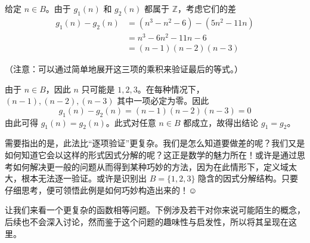 给定 $n \in B$。由于 $g_1(n)$ 和 $g_2(n)$ 都属于 $\mathbb{Z}$，考虑它们的差
\begin{align*}
    g_1(n) - g_2(n) &= (n^3 - n^2 - 6) - (5n^2 - 11n) \\
    &= n^3 - 6n^2 - 11n - 6 \\
    &= (n - 1)(n - 2)(n - 3)
\end{align*}

（注意：可以通过简单地展开这三项的乘积来验证最后的等式。）

由于 $n \in B$，因此 $n$ 只可能是 $1,2,3$。在每种情况下，$(n - 1), (n - 2), (n - 3)$ 其中一项必定为零。因此
\[g_1(n) - g_2(n) = (n - 1)(n - 2)(n - 3) = 0\]
由此可得 $g_1(n) = g_2(n)$。此式对任意 $n \in B$ 都成立，故得出结论 $g_1 = g_2$。

需要指出的是，此法比``逐项验证''更复杂。我们是怎么知道要做差的呢？我们又是如何知道它会以这样的形式因式分解的呢？这正是数学的魅力所在！或许是通过思考如何解决更一般的问题从而得到某种巧妙的方法，因为在此情形下，定义域太大，根本无法逐一验证。或许是识别出 $B = \{1, 2, 3\}$ 隐含的因式分解结构。只要仔细思考，便可领悟此例是如何巧妙构造出来的！$\smiley{}$

让我们来看一个更复杂的函数相等问题。下例涉及若干对你来说可能陌生的概念，后续也不会深入讨论，然而鉴于这个问题的趣味性与启发性，所以将其呈现在这里。

